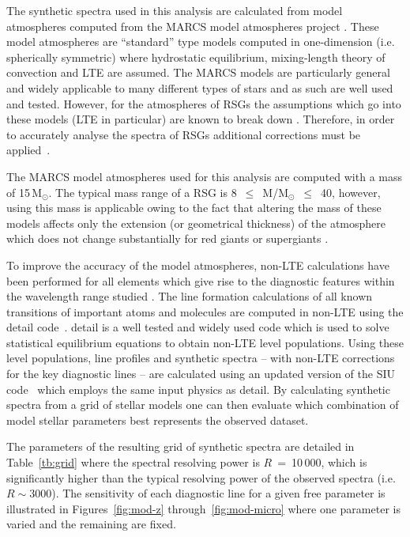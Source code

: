 The synthetic spectra used in this analysis are calculated from model atmospheres computed from the MARCS model atmospheres project
\citep{1975A&A....42..407G,2008A&A...486..951G}.
These model atmospheres are ``standard'' type models computed in one-dimension (i.e. spherically symmetric)
where hydrostatic equilibrium, mixing-length theory of convection and LTE are assumed.
The MARCS models are particularly general and widely applicable to many different types of stars and as such are well used and tested.
However, for the atmospheres of RSGs the assumptions which go into these models (LTE in particular) are known to break down
\citep{2002AN....323..213F,2010ASPC..425..124P}.
Therefore, in order to accurately analyse the spectra of RSGs additional corrections must be applied~\citep{2012ApJ...751..156B}.

The MARCS model atmospheres used for this analysis are computed with a mass of 15\,M$_{\odot}$.
The typical mass range of a RSG is 8~$\leq$~M/M$_{\odot}$~$\leq$~40, however,
using this mass is applicable owing to the fact that altering the mass of these models affects only the extension
(or geometrical thickness) of the atmosphere which does not change substantially for red giants or supergiants
\citep[see][]{2010MNRAS.407.1203D}.

To improve the accuracy of the model atmospheres,
non-LTE calculations have been performed for all elements which give rise to the diagnostic features within the wavelength range studied
\citep{2012ApJ...751..156B,2013ApJ...764..115B,2015ApJ...804..113B}.
The line formation calculations of all known transitions of important atoms and molecules are computed in non-LTE using the {\sc detail} code~\citep{1981PhDT.......113G}.
{\sc detail} is a well tested and widely used code which is used to solve statistical equilibrium equations to obtain non-LTE level populations.
Using these level populations, line profiles and synthetic spectra -- with non-LTE corrections for the key diagnostic lines -- are calculated using an updated version of the {\sc SIU} code~\citep{1999PhDT.........3R,2012ApJ...751..156B} which employs the same input physics as {\sc detail}.
By calculating synthetic spectra from a grid of stellar models one can then evaluate which combination of model stellar parameters best represents the observed dataset.

The parameters of the resulting grid of synthetic spectra are detailed in
Table~\ref{tb:grid} where the spectral resolving power is $R$~=~10\,000,
which is significantly higher than the typical resolving power of the observed spectra
(i.e. $R \sim 3000$).
The sensitivity of each diagnostic line for a given free parameter is illustrated in Figures~\ref{fig:mod-z} through~\ref{fig:mod-micro} where one parameter is varied and the remaining are fixed.

